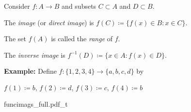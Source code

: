 \documentclass[10pt,aspectratio=149]{beamer}
\begin{document}
\begin{frame}
\begin{definition}
Consider $f \colon A \to B$ and subsets $C \subset A$ and $D \subset B$.

\pause
The \emph{image} (or \emph{direct image}) is
\quad $f(C) \coloneqq \bigl\{ f(x) \in B : x \in C \bigr\}$.

\pause
The set $f(A)$ is called the \emph{range} of $f$.

\pause
The \emph{inverse image} is \quad
$f^{-1}(D) \coloneqq \bigl\{ x \in A : f(x) \in D \bigr\}$.
\end{definition}

\pause

\textbf{Example:}
Define
$f \colon \{ 1,2,3,4 \} \to \{ a,b,c,d \}$ by

$f(1) \coloneqq b$,
$f(2) \coloneqq d$,
$f(3) \coloneqq c$,
$f(4) \coloneqq b$

{funcimags_full.pdf_t}

\end{frame}
\end{document}
